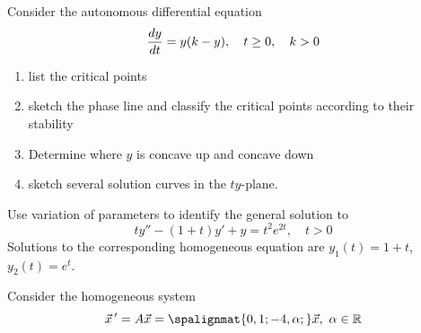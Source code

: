 \documentclass[12pt]{exam}
\begin{document}
\begin{questions}
    

    

    
\newpage \Initials

    \question[10] Consider the autonomous differential equation 
    $${\frac{dy}{dt}} = y(k - y), \quad t \ge 0, \quad k  > 0$$  %
    \begin{enumerate}[label=(\roman*)]
        \item list the critical points \vspace{1cm}
        \item sketch the phase line and classify the critical points according to their stability \vspace{4cm}
        \item Determine where $y$ is concave up and concave down \vspace{6cm}
        \item sketch several solution curves in the $ty$-plane. 
    \end{enumerate}

\newpage \Initials

    \question[10] 
    
    
    Use variation of parameters to identify the general solution to $$t y'' - (1+t)y' + y = t^2e^{2t}, \quad t > 0$$ Solutions to the corresponding homogeneous equation are $y_1(t) = 1+t$, $y_2(t) = e^t$. %
    


\newpage \Initials

    \question[10] 
    Consider the homogeneous system 
    $$\vec x\,'=A\vec x=\spalignmat{0,1;-4,\alpha;}\vec x,\ \alpha \in \mathbb R$$ %
    \begin{parts}

\end{parts}
\end{questions}
\end{document}
